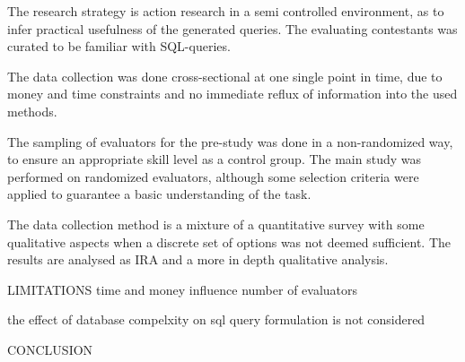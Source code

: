     The research strategy is action research in a semi controlled environment, as to infer practical usefulness of the generated queries. The evaluating contestants was curated to be familiar with SQL-queries.
    
    The data collection was done cross-sectional at one single point in time, due to money and time constraints and no immediate reflux of information into the used methods.
    
    The sampling of evaluators for the pre-study was done in a non-randomized way, to ensure an appropriate skill level as a control group. The main study was performed on randomized evaluators, although some selection criteria were applied to guarantee a basic understanding of the task.
    
    The data collection method is a mixture of a quantitative survey with some qualitative aspects when a discrete set of options was not deemed sufficient. The results are analysed as IRA and a more in depth qualitative analysis.
    
LIMITATIONS
    time and money influence number of evaluators
    
    the effect of database compelxity on sql query formulation is not considered \cite{Taipalus2020TheEO}
    
    
CONCLUSION
